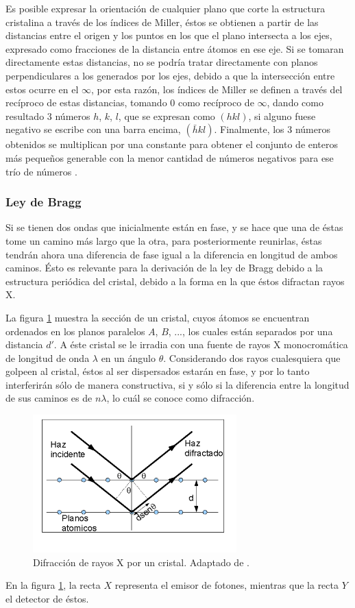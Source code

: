 \documentclass[../main.tex]{subfiles}
\begin{document}
Es posible expresar la orientación de cualquier plano que corte la estructura cristalina a través de los índices de Miller, éstos se obtienen a partir de las distancias entre el origen y los puntos en los que el plano intersecta a los ejes, expresado como fracciones de la distancia entre átomos en ese eje. Si se tomaran directamente estas distancias, no se podría tratar directamente con planos perpendiculares a los generados por los ejes, debido a que la intersección entre estos ocurre en el $\infty$, por esta razón, los índices de Miller se definen a través del recíproco de estas distancias, tomando 0 como recíproco de $\infty$, dando como resultado 3 números $h$, $k$, $l$, que se expresan como $(hkl)$, si alguno fuese negativo se escribe con una barra encima, $\left(\bar{h}kl\right)$. Finalmente, los 3 números obtenidos se multiplican por una constante para obtener el conjunto de enteros más pequeños generable con la menor cantidad de números negativos para ese trío de números \cite{Cullity2014}.
\subsubsection{Ley de Bragg}
Si se tienen dos ondas que inicialmente están en fase, y se hace que una de éstas tome un camino más largo que la otra, para posteriormente reunirlas, éstas tendrán ahora una diferencia de fase igual a la diferencia en longitud de ambos caminos. Ésto es relevante para la derivación de la ley de Bragg debido a la estructura periódica del cristal, debido a la forma en la que éstos difractan rayos X.

La figura \ref{fig:braggdiag} muestra la sección de un cristal, cuyos átomos se encuentran ordenados en los planos paralelos $A$, $B$, ..., los cuales están separados por una distancia $d'$. A éste cristal se le irradia con una fuente de rayos X monocromática de longitud de onda $\lambda$ en un ángulo $\theta$. Considerando dos rayos cualesquiera que golpeen al cristal, éstos al ser dispersados estarán en fase, y por lo tanto interferirán sólo de manera constructiva, si y sólo si la diferencia entre la longitud de sus caminos es de $n\lambda$, lo cuál se conoce como difracción.
\begin{figure}[H]
    \centering
    \includegraphics[width=0.7\textwidth]{fig/braggdiag.png}
    \caption{Difracción de rayos X por un cristal. Adaptado de \cite{Cullity2014}.}
    \label{fig:braggdiag}
\end{figure}
En la figura \ref{fig:braggdiag}, la recta $X$ representa el emisor de fotones, mientras que la recta $Y$ el detector de éstos.
\end{document}
